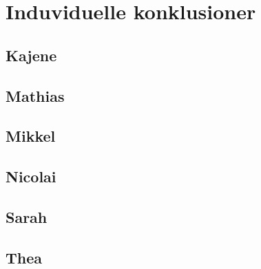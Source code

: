 \chapter{Induviduelle konklusioner}









\section{Kajene}

\section{Mathias}

\section{Mikkel}

\section{Nicolai}

\section{Sarah}

\section{Thea}
